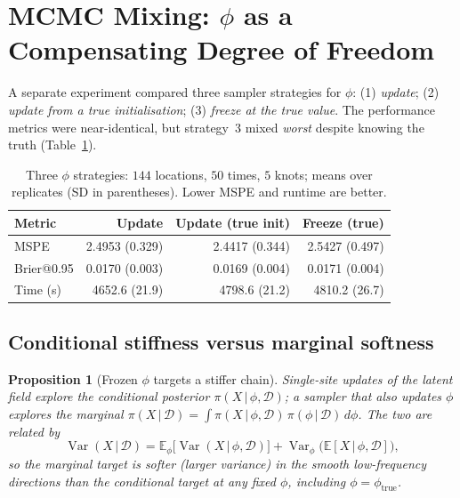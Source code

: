 \documentclass[11pt]{article}
\newtheorem{proposition}{Proposition}
\theoremstyle{definition}
\newcommand{\E}{\mathbb{E}}
\newcommand{\Var}{\operatorname{Var}}
\newcommand{\D}{\mathcal{D}}
\newcommand{\given}{\,\vert\,}
\begin{document}
\section{MCMC Mixing: $\phi$ as a Compensating Degree of Freedom}
\label{sec:mixing}

A separate experiment compared three sampler strategies for $\phi$:
(1) \emph{update}; (2) \emph{update from a true initialisation};
(3) \emph{freeze at the true value}. The performance metrics were
near-identical, but strategy~3 mixed \emph{worst} despite knowing the
truth (Table~\ref{tab:phi-strategies}).

\begin{table}[h]
\centering
\caption{Three $\phi$ strategies: $144$ locations, $50$ times, $5$
         knots; means over replicates (SD in parentheses). Lower MSPE
         and runtime are better.}
\label{tab:phi-strategies}
\begin{tabular}{l r r r}
\toprule
Metric & Update & Update (true init) & Freeze (true) \\
\midrule
MSPE      & 2.4953 (0.329) & 2.4417 (0.344) & 2.5427 (0.497) \\
Brier@0.95 & 0.0170 (0.003) & 0.0169 (0.004) & 0.0171 (0.004) \\
Time (s)  & 4652.6 (21.9) & 4798.6 (21.2) & 4810.2 (26.7) \\
\bottomrule
\end{tabular}
\end{table}

\subsection{Conditional stiffness versus marginal softness}

\begin{proposition}[Frozen $\phi$ targets a stiffer chain]
\label{prop:stiff}
Single-site updates of the latent field explore the conditional
posterior $\pi(X \given \phi, \D)$; a sampler that also updates $\phi$
explores the marginal
$\pi(X \given \D) = \int \pi(X \given \phi, \D)\,\pi(\phi \given \D)\,
d\phi$. The two are related by
\begin{equation}
  \Var(X \given \D)
    = \E_\phi\!\big[\Var(X \given \phi, \D)\big]
    + \Var_\phi\!\big(\E[X \given \phi, \D]\big),
  \label{eq:cond-marg}
\end{equation}
so the marginal target is \emph{softer} (larger variance) in the
smooth low-frequency directions than the conditional target at any
fixed $\phi$, including $\phi = \phi_{\mathrm{true}}$.
\end{proposition}
\end{document}
